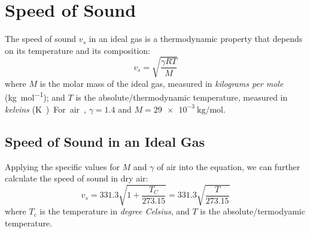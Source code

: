 \section{Speed of Sound}
%




%
%
%
%
The speed of sound $v_s$ in an ideal gas is a thermodynamic property that
depends on its temperature and its composition:
\begin{equation}
  v_s=\sqrt{\frac{\gamma RT}M}
\end{equation}
where $M$ is the molar mass of the ideal gas, measured in
\emph{kilograms per mole} (\si{\kilo\gram\per\mol}); and $T$ is the
absolute/thermodynamic temperature, measured in \emph{kelvins} (\si\kelvin).
For air, $\gamma=1.4$ and $M=\SI{29e-3}{\kilo\gram\per\mol}$.

\subsection{Speed of Sound in an Ideal Gas}

Applying the specific values for $M$ and $\gamma$ of air into the equation, we
can further calculate the speed of sound in dry air:
\begin{equation}
    \boxed{
      v_s=331.3\sqrt{1+\frac{T_C}{273.15}}=331.3\sqrt{\frac T{273.15}}
    }
\end{equation}
where $T_c$ is the temperature in \emph{degree Celsius}, and $T$ is the
absolute/termodyamic temperature.



